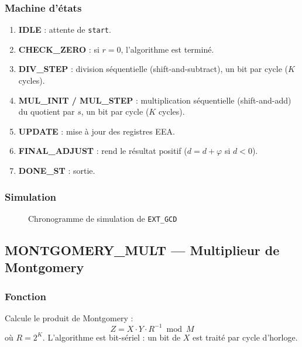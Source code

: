 \subsubsection{Machine d'états}
\begin{enumerate}
  \item \textbf{IDLE} : attente de \texttt{start}.
  \item \textbf{CHECK\_ZERO} : si $r = 0$, l'algorithme est terminé.
  \item \textbf{DIV\_STEP} : division séquentielle (shift-and-subtract),
        un bit par cycle ($K$ cycles).
  \item \textbf{MUL\_INIT / MUL\_STEP} : multiplication séquentielle
        (shift-and-add) du quotient par $s$, un bit par cycle ($K$ cycles).
  \item \textbf{UPDATE} : mise à jour des registres EEA.
  \item \textbf{FINAL\_ADJUST} : rend le résultat positif ($d = d + \varphi$
        si $d < 0$).
  \item \textbf{DONE\_ST} : sortie.
\end{enumerate}

\subsubsection{Simulation}
\begin{figure}[H]
\centering
{}
\caption{Chronogramme de simulation de \texttt{EXT\_GCD}}
\label{fig:sim_gcd}
\end{figure}

\subsection{MONTGOMERY\_MULT --- Multiplieur de Montgomery}
\label{sec:mont_mult}

\subsubsection{Fonction}
Calcule le produit de Montgomery :
\[
  Z = X \cdot Y \cdot R^{-1} \bmod M
\]
où $R = 2^K$. L'algorithme est bit-sériel : un bit de $X$ est traité par
cycle d'horloge.

